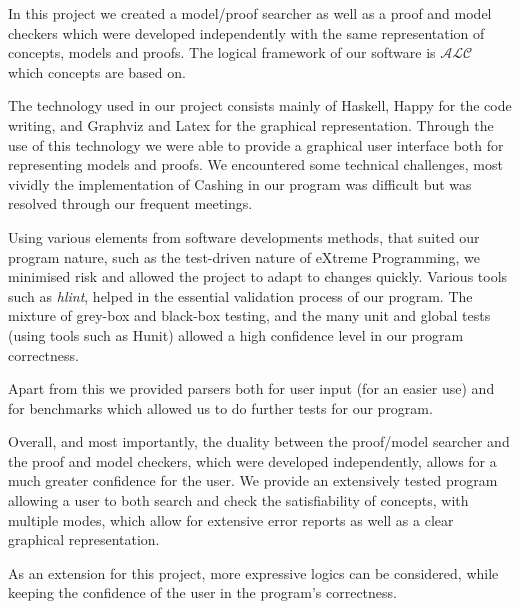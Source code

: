 In this project we created a model/proof searcher as well as a proof and model checkers which were developed independently with the same representation of concepts, models and proofs. The logical framework of our software is $\mathcal{ALC}$ which concepts are based on. 

The technology used in our project consists mainly of Haskell, Happy for the code writing, and Graphviz and Latex for the graphical representation. Through the use of this technology we were able to provide a graphical user interface both for representing models and proofs. We encountered some technical challenges, most vividly the implementation of Cashing in our program was difficult but was resolved through our frequent meetings.

Using various elements from software developments methods, that suited our program nature, such as the test-driven nature of eXtreme Programming, we minimised risk and allowed the project to adapt to changes quickly. Various tools such as \emph{hlint}, helped in the essential validation process of our program. The mixture of grey-box and black-box testing, and the many unit and global tests (using tools such as Hunit) allowed a high confidence level in our program correctness. 

Apart from this we provided parsers both for user input (for an easier use) and for benchmarks which allowed us to do further tests for our program.

Overall, and most importantly, the duality between the proof/model searcher and the proof and model checkers, which were developed independently, allows for a much greater confidence for the user. We provide an extensively tested program allowing a user to both search and check the satisfiability of concepts, with multiple modes, which allow for extensive error reports as well as a clear graphical representation. 

As an extension for this project, more expressive logics can be considered, while keeping the confidence of the user in the program's correctness. 



 

